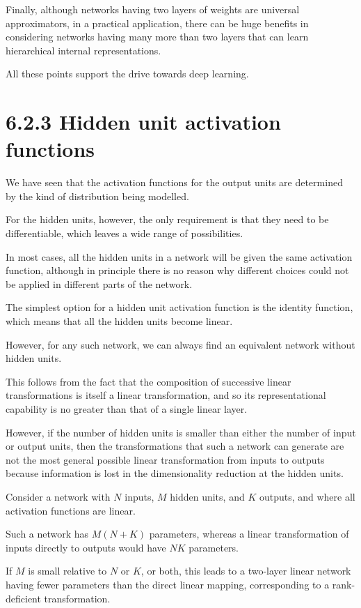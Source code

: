 \documentclass{article}
\begin{document}
Finally, although networks having two layers of weights are universal approximators, in a practical application, there can be huge benefits in considering networks having many more than two layers that can learn hierarchical internal representations. 

All these points support the drive towards deep learning.


\section{6.2.3 Hidden unit activation functions}

We have seen that the activation functions for the output units are determined by the kind of distribution being modelled. 

For the hidden units, however, the only requirement is that they need to be differentiable, which leaves a wide range of possibilities. 

In most cases, all the hidden units in a network will be given the same activation function, although in principle there is no reason why different choices could not be applied in different parts of the network.

The simplest option for a hidden unit activation function is the identity function, which means that all the hidden units become linear. 

However, for any such network, we can always find an equivalent network without hidden units. 

This follows from the fact that the composition of successive linear transformations is itself a linear transformation, and so its representational capability is no greater than that of a single linear layer. 

However, if the number of hidden units is smaller than either the number of input or output units, then the transformations that such a network can generate are not the most general possible linear transformation from inputs to outputs because information is lost in the dimensionality reduction at the hidden units. 

Consider a network with $N$ inputs, $M$ hidden units, and $K$ outputs, and where all activation functions are linear. 

Such a network has $M(N + K)$ parameters, whereas a linear transformation of inputs directly to outputs would have $NK$ parameters. 

If $M$ is small relative to $N$ or $K$, or both, this leads to a two-layer linear network having fewer parameters than the direct linear mapping, corresponding to a rank-deficient transformation. 
\end{document}

